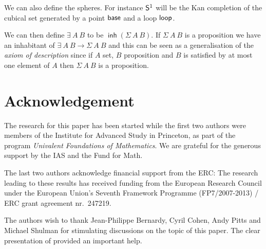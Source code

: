 \documentclass[10pt,a4paper]{article}
\DeclareMathOperator{\inh}{\mathsf{inh}}
\newcommand{\Sph}{{\sf S}^1}
\begin{document}
We can also define the spheres. For instance $\Sph$ will be the Kan
completion of the cubical set generated by a point ${\sf base}$ and a
loop ${\sf loop}$.

We can then define $\exists~A~B$ to be $\inh(\Sigma~A~B)$. If
$\Sigma~A~B$ is a proposition we have an inhabitant of $\exists~A~B\to
\Sigma~ A~B$ and this can be seen as a generalisation of the {\em
  axiom of description} since if $A$ set, $B$ proposition and $B$ is
satisfied by at most one element of $A$ then $\Sigma~A~B$ is a
proposition.

\section*{Acknowledgement}
The research for this paper has been started while the first two
authors were members of the Institute for Advanced Study in Princeton,
as part of the program \emph{Univalent Foundations of Mathematics}.
We are grateful for the generous support by the IAS and the Fund for Math.

The last two authors acknowledge financial support from the ERC:  The research leading
to these results has received funding from the European Research Council under
the European Union's Seventh Framework Programme (FP7/2007-2013) / ERC
grant agreement nr.\ 247219.

 The authors wish to thank Jean-Philippe Bernardy, Cyril Cohen, Andy Pitts and Michael Shulman
for stimulating discussions on the topic of this paper. The clear presentation of \cite{Williamson}
provided an important help.
\end{document}
